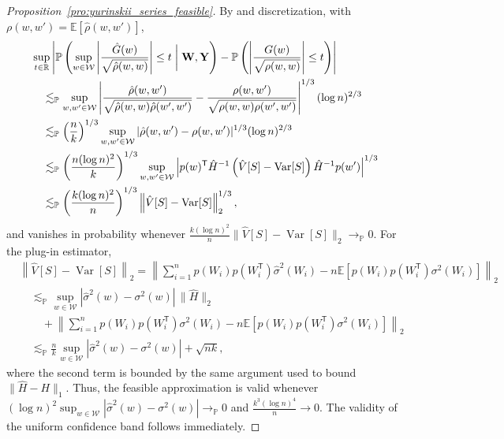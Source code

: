 \documentclass[11pt,lof]{puthesis}
\renewcommand{\P}{\ensuremath{\mathbb{P}}}
\newcommand{\R}{\ensuremath{\mathbb{R}}}
\newcommand{\E}{\ensuremath{\mathbb{E}}}
\newcommand{\bW}{\ensuremath{\mathbf{W}}}
\newcommand{\bY}{\ensuremath{\mathbf{Y}}}
\newcommand{\cW}{\ensuremath{\mathcal{W}}}
\newcommand{\T}{\ensuremath{\mathsf{T}}}
\DeclareMathOperator{\Var}{Var}
\theoremstyle{break}
\theoremstyle{proof}
\newtheorem{proof}{Proof}
\begin{document}
\begin{proof}[Proposition~\ref{pro:yurinskii_series_feasible}]
By \citet[Lemma~3.1]{chernozhukov2013gaussian} and discretization,
with $\rho(w,w') = \E[\hat\rho(w,w')]$,
%
\begin{align*}
&\sup_{t \in \R}
\left|
\P\left(
\sup_{w \in \cW}
\left|
\frac{\hat G(w)}{\sqrt{\hat\rho(w,w)}}
\right|
\leq t \biggm| \bW, \bY
\right)
- \P\left(
\left|
\frac{G(w)}{\sqrt{\rho(w,w)}}
\right|
\leq t
\right)
\right| \\
&\quad\lesssim_\P
\sup_{w,w' \in \cW}
\left|
\frac{\hat\rho(w,w')}
{\sqrt{\hat\rho(w,w)\hat\rho(w',w')}}
- \frac{\rho(w,w')}
{\sqrt{\rho(w,w)\rho(w',w')}}
\right|^{1/3}
(\log n)^{2/3} \\
&\quad\lesssim_\P
\left(\frac n k \right)^{1/3}
\sup_{w,w' \in \cW} |\hat\rho(w,w') - \rho(w,w')|^{1/3}
(\log n)^{2/3} \\
&\quad\lesssim_\P
\left( \frac{n (\log n)^2}{k} \right)^{1/3}
\sup_{w,w' \in \cW}
\left|
p(w)^\T \hat H^{-1}
\left(
\hat{V}[S]
- \Var[S]
\right)
\hat H^{-1} p(w')
\right|^{1/3} \\
&\quad\lesssim_\P
\left( \frac{k (\log n)^2}{n} \right)^{1/3}
\left\|
\hat{V}[S]
- \Var[S]
\right\|_2^{1/3},
\end{align*}
%
and vanishes in probability whenever
$\frac{k (\log n)^2}{n}
\big\| \hat{V}[S] - \Var[S] \big\|_2 \to_\P 0$.
For the plug-in estimator,
%
\begin{align*}
&\left\|
\hat{V}[S]
- \Var[S]
\right\|_2
=
\left\|
\sum_{i=1}^n
p(W_i) p(W_i^\T)
\hat\sigma^2(W_i)
- n \E\left[
p(W_i) p(W_i^\T)
\sigma^2(W_i)
\right]
\right\|_2 \\
&\quad\lesssim_\P
\sup_{w \in \cW}
|\hat{\sigma}^2(w)-\sigma^2(w)|
\, \big\| \hat H \big\|_2 \\
&\qquad+
\left\|
\sum_{i=1}^n
p(W_i) p(W_i^\T)
\sigma^2(W_i)
- n \E\left[
p(W_i) p(W_i^\T)
\sigma^2(W_i)
\right]
\right\|_2 \\
&\quad\lesssim_\P
\frac{n}{k}
\sup_{w \in \cW}
|\hat{\sigma}^2(w)-\sigma^2(w)|
+ \sqrt{n k},
\end{align*}
%
where the second term is bounded by the same argument
used to bound $\|\hat H - H\|_1$.
Thus, the feasible approximation is valid whenever
$(\log n)^2 \sup_{w \in \cW}
|\hat{\sigma}^2(w)-\sigma^2(w)| \to_\P 0$
and $\frac{k^3 (\log n)^4}{n} \to 0$.
The validity of the uniform confidence band follows immediately.
%
\end{proof}
\end{document}
